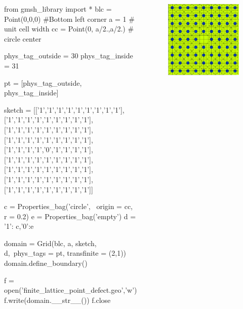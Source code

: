 \documentclass[xcolor=table,serif,handout]{beamer}
\begin{document}
	\begin{frame}[fragile]
		\begin{columns}
			\tiny
			\begin{python}
			from gmsh_library import * 
blc = Point(0,0,0) #Bottom left corner
a = 1 # unit cell width
cc = Point(0, a/2.,a/2.) # circle center

phys_tag_outside = 30
phys_tag_inside = 31

pt = [phys_tag_outside, phys_tag_inside] 

sketch =
 [['1','1','1','1','1','1','1','1','1'],
  ['1','1','1','1','1','1','1','1','1'],
  ['1','1','1','1','1','1','1','1','1'],
  ['1','1','1','1','1','1','1','1','1'],
  ['1','1','1','1','0','1','1','1','1'],
  ['1','1','1','1','1','1','1','1','1'],
  ['1','1','1','1','1','1','1','1','1'],
  ['1','1','1','1','1','1','1','1','1'],
  ['1','1','1','1','1','1','1','1','1']]
  
c = Properties_bag('circle', \
		 origin = cc, r = 0.2)
e = Properties_bag('empty')
d = {'1': c,'0':e}

domain = Grid(blc, a, sketch, d,\
 phys_tags = pt, transfinite = (2,1))
domain.define_boundary()

f = open('finite_lattice_point_defect.geo','w')
f.write(domain.__str__())
f.close
			\end{python}
			\begin{figure}
			\centering
			\includegraphics[scale=0.2]{lattice_point_deffect.pdf}
			\end{figure}
		\end{columns}
	\end{frame}
\end{document}

